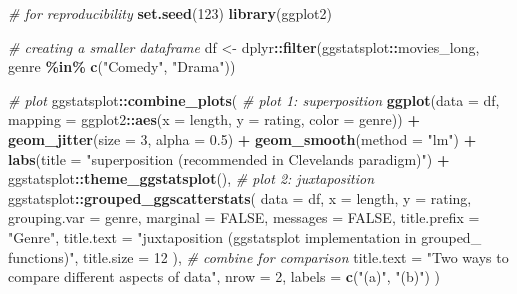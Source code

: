 \documentclass[
]{article}
\newenvironment{Shaded}{\begin{snugshade}}{\end{snugshade}}
\newcommand{\CommentTok}[1]{\textcolor[rgb]{0.56,0.35,0.01}{\textit{#1}}}
\newcommand{\DataTypeTok}[1]{\textcolor[rgb]{0.13,0.29,0.53}{#1}}
\newcommand{\DecValTok}[1]{\textcolor[rgb]{0.00,0.00,0.81}{#1}}
\newcommand{\FloatTok}[1]{\textcolor[rgb]{0.00,0.00,0.81}{#1}}
\newcommand{\KeywordTok}[1]{\textcolor[rgb]{0.13,0.29,0.53}{\textbf{#1}}}
\newcommand{\NormalTok}[1]{#1}
\newcommand{\OperatorTok}[1]{\textcolor[rgb]{0.81,0.36,0.00}{\textbf{#1}}}
\newcommand{\OtherTok}[1]{\textcolor[rgb]{0.56,0.35,0.01}{#1}}
\newcommand{\StringTok}[1]{\textcolor[rgb]{0.31,0.60,0.02}{#1}}
\begin{document}
\begin{Shaded}
\begin{Highlighting}[]
\CommentTok{\# for reproducibility}
\KeywordTok{set.seed}\NormalTok{(}\DecValTok{123}\NormalTok{)}
\KeywordTok{library}\NormalTok{(ggplot2)}

\CommentTok{\# creating a smaller dataframe}
\NormalTok{df <{-}}\StringTok{ }\NormalTok{dplyr}\OperatorTok{::}\KeywordTok{filter}\NormalTok{(ggstatsplot}\OperatorTok{::}\NormalTok{movies\_long, genre }\OperatorTok{\%in\%}\StringTok{ }\KeywordTok{c}\NormalTok{(}\StringTok{"Comedy"}\NormalTok{, }\StringTok{"Drama"}\NormalTok{))}

\CommentTok{\# plot}
\NormalTok{ggstatsplot}\OperatorTok{::}\KeywordTok{combine\_plots}\NormalTok{(}
  \CommentTok{\# plot 1: superposition}
  \KeywordTok{ggplot}\NormalTok{(}\DataTypeTok{data =}\NormalTok{ df, }\DataTypeTok{mapping =}\NormalTok{ ggplot2}\OperatorTok{::}\KeywordTok{aes}\NormalTok{(}\DataTypeTok{x =}\NormalTok{ length, }\DataTypeTok{y =}\NormalTok{ rating, }\DataTypeTok{color =}\NormalTok{ genre)) }\OperatorTok{+}
\StringTok{    }\KeywordTok{geom\_jitter}\NormalTok{(}\DataTypeTok{size =} \DecValTok{3}\NormalTok{, }\DataTypeTok{alpha =} \FloatTok{0.5}\NormalTok{) }\OperatorTok{+}
\StringTok{    }\KeywordTok{geom\_smooth}\NormalTok{(}\DataTypeTok{method =} \StringTok{"lm"}\NormalTok{) }\OperatorTok{+}
\StringTok{    }\KeywordTok{labs}\NormalTok{(}\DataTypeTok{title =} \StringTok{"superposition (recommended in Cleveland\textquotesingle{}s paradigm)"}\NormalTok{) }\OperatorTok{+}
\StringTok{    }\NormalTok{ggstatsplot}\OperatorTok{::}\KeywordTok{theme\_ggstatsplot}\NormalTok{(),}
  \CommentTok{\# plot 2: juxtaposition}
\NormalTok{  ggstatsplot}\OperatorTok{::}\KeywordTok{grouped\_ggscatterstats}\NormalTok{(}
    \DataTypeTok{data =}\NormalTok{ df,}
    \DataTypeTok{x =}\NormalTok{ length,}
    \DataTypeTok{y =}\NormalTok{ rating,}
    \DataTypeTok{grouping.var =}\NormalTok{ genre,}
    \DataTypeTok{marginal =} \OtherTok{FALSE}\NormalTok{,}
    \DataTypeTok{messages =} \OtherTok{FALSE}\NormalTok{,}
    \DataTypeTok{title.prefix =} \StringTok{"Genre"}\NormalTok{,}
    \DataTypeTok{title.text =} \StringTok{"juxtaposition (\textasciigrave{}ggstatsplot\textasciigrave{} implementation in \textasciigrave{}grouped\_\textasciigrave{} functions)"}\NormalTok{,}
    \DataTypeTok{title.size =} \DecValTok{12}
\NormalTok{  ),}
  \CommentTok{\# combine for comparison}
  \DataTypeTok{title.text =} \StringTok{"Two ways to compare different aspects of data"}\NormalTok{,}
  \DataTypeTok{nrow =} \DecValTok{2}\NormalTok{,}
  \DataTypeTok{labels =} \KeywordTok{c}\NormalTok{(}\StringTok{"(a)"}\NormalTok{, }\StringTok{"(b)"}\NormalTok{)}
\NormalTok{)}
\end{Highlighting}
\end{Shaded}
\end{document}
